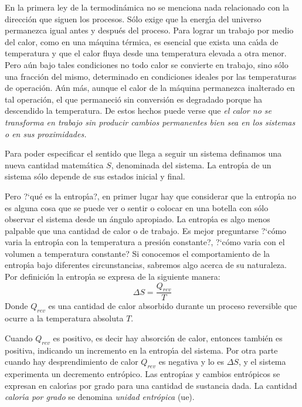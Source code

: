  En la primera ley de la termodin\'amica no se menciona nada relacionado con la direcci\'on que siguen los procesos. S\'olo exige que la energ\'{\i}a del universo permanezca igual antes y  despu\'es del proceso. Para lograr un trabajo por medio del calor, como en una m\'aquina t\'ermica, es esencial que exista una ca\'{\i}da de temperatura y que el calor fluya desde una tempe\-ratura elevada a otra menor. Pero a\'un bajo tales condiciones no todo calor se convierte en trabajo, sino s\'olo una fracci\'on del mismo, determinado en condiciones ideales por las temperaturas de operaci\'on. A\'un m\'as, aunque el calor de la m\'aquina permanezca inalterado en tal operaci\'on, el que permaneci\'o sin conversi\'on es degradado porque ha descendido la temperatura. De estos hechos puede verse que \textit{el calor no se transforma en trabajo sin producir cambios permanentes bien sea en los sistemas o en sus proximidades.}

Para poder especificar el sentido que llega a seguir un sistema definamos una nueva cantidad matem\'atica $S$, denominada \textit{} del sistema. La entrop\'{\i}a  de un sistema s\'olo depende de sus estados inicial y final.

Pero ?`qu\'e es la entrop\'{\i}a?, en primer lugar hay que considerar que la entrop\'{\i}a no es alguna cosa que se puede ver o sentir o colocar en una botella con s\'olo observar el sistema desde un \'angulo apropiado. La entrop\'{\i}a es algo menos palpable que una cantidad de calor o de trabajo. Es mejor preguntarse ?`c\'omo varia la entrop\'{\i}a con la temperatura a presi\'on constante?, ?`c\'omo varia con el volumen a temperatura constante? Si conocemos el comportamiento de la entrop\'{\i}a bajo diferentes circunstancias, sabremos algo acerca de su naturaleza.
Por definici\'on la entrop\'{\i}a se expresa de la siguiente manera:
   \begin{equation}
   \Delta S = \frac{Q _{rev}}{T}
   \end{equation}
Donde $Q _{rev}$ es una cantidad de calor absorbido durante un proceso reversible que ocurre a
la temperatura absoluta  $T$.

Cuando $Q _{rev}$ es positivo, es decir hay absorci\'on de calor, entonces tambi\'en  es positiva, indicando un incremento en la entrop\'{\i}a del sistema. Por otra parte cuando hay desprendimiento de calor $Q _{rev}$ es negativa y lo es $\Delta S$, y el
sistema experimenta un decremento entr\'opico. Las entrop\'{\i}as y cambios entr\'opicos se expresan en  calor\'{\i}as por grado para una cantidad de sustancia dada. La cantidad \textit{calor\'{\i}a por grado} se denomina \textit{unidad
entr\'opica} (ue).

